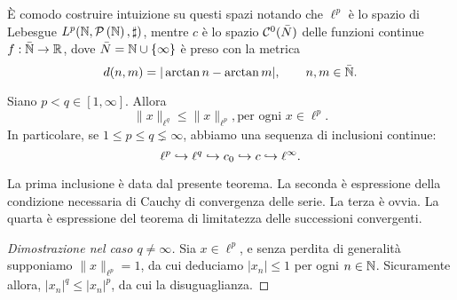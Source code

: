 È comodo costruire intuizione su questi spazi notando che $\ell^p$ è lo spazio di Lebesgue $L^p(\mathbb{N}, \mathcal{P}\left({\mathbb{N}}\right), \sharp)$, mentre $c$ è lo spazio $\mathcal{C}^0(\bar N)$ delle funzioni continue $f : \bar {\mathbb{N}} \to \mathbb{R}$, dove $\bar N = \mathbb{N} \cup \{\infty\}$ è preso con la metrica
\begin{equation*}
	d(n,m) = |\arctan n - \arctan m|, \qquad n, m \in \bar{\mathbb{N}}.
\end{equation*}

\begin{theorem}
	Siano $p<q \in [1, \infty]$.
	Allora
	\begin{equation*}
		\|x\|_{\ell^q} \leq \|x\|_{\ell^p}, \text{per ogni $x \in \ell^p$.}
	\end{equation*}
	In particolare, se $1 \leq p \leq q \lneq \infty$, abbiamo una sequenza di inclusioni continue:
	\begin{equation*}
		\ell^p \hookrightarrow \ell^q \hookrightarrow c_0 \hookrightarrow c \hookrightarrow \ell^\infty.
	\end{equation*}
\end{theorem}
\begin{remark}
	La prima inclusione è data dal presente teorema. La seconda è espressione della condizione necessaria di Cauchy di convergenza delle serie. La terza è ovvia. La quarta è espressione del teorema di limitatezza delle successioni convergenti.
\end{remark}
\begin{proof}[Dimostrazione nel caso $q \neq \infty$]
	Sia $x \in \ell^p$, e senza perdita di generalità supponiamo $\|x\|_{\ell^p} = 1$, da cui deduciamo $|x_n| \leq 1$ per ogni $n \in \mathbb{N}$. Sicuramente allora, $|x_n|^q \leq |x_n|^p$, da cui la disuguaglianza.
\end{proof}

